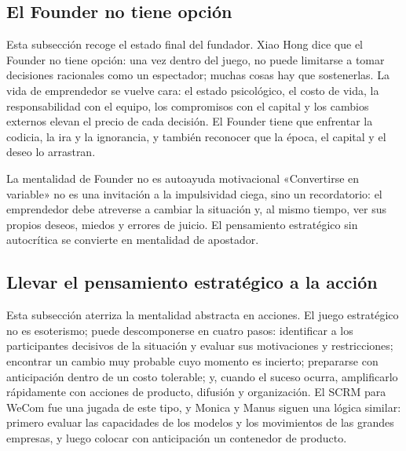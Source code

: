 \subsection{El Founder no tiene opción}

Esta subsección recoge el estado final del fundador. Xiao Hong dice que el Founder no tiene opción: una vez dentro del juego, no puede limitarse a tomar decisiones racionales como un espectador; muchas cosas hay que sostenerlas. La vida de emprendedor se vuelve cara: el estado psicológico, el costo de vida, la responsabilidad con el equipo, los compromisos con el capital y los cambios externos elevan el precio de cada decisión. El Founder tiene que enfrentar la codicia, la ira y la ignorancia, y también reconocer que la época, el capital y el deseo lo arrastran.

\begin{warningbox}{La mentalidad de Founder no es autoayuda motivacional}
«Convertirse en variable» no es una invitación a la impulsividad ciega, sino un recordatorio: el emprendedor debe atreverse a cambiar la situación y, al mismo tiempo, ver sus propios deseos, miedos y errores de juicio. El pensamiento estratégico sin autocrítica se convierte en mentalidad de apostador.
\end{warningbox}

\subsection{Llevar el pensamiento estratégico a la acción}

Esta subsección aterriza la mentalidad abstracta en acciones. El juego estratégico no es esoterismo; puede descomponerse en cuatro pasos: identificar a los participantes decisivos de la situación y evaluar sus motivaciones y restricciones; encontrar un cambio muy probable cuyo momento es incierto; prepararse con anticipación dentro de un costo tolerable; y, cuando el suceso ocurra, amplificarlo rápidamente con acciones de producto, difusión y organización. El SCRM para WeCom fue una jugada de este tipo, y Monica y Manus siguen una lógica similar: primero evaluar las capacidades de los modelos y los movimientos de las grandes empresas, y luego colocar con anticipación un contenedor de producto.

